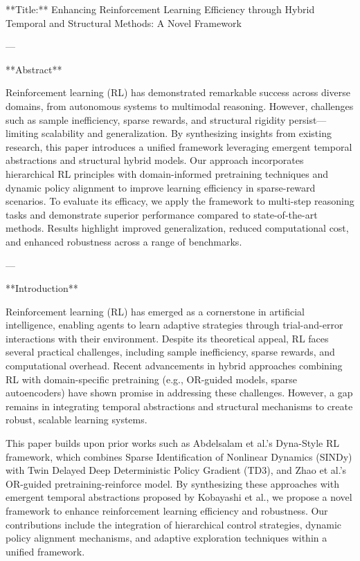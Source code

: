 **Title:** Enhancing Reinforcement Learning Efficiency through Hybrid Temporal and Structural Methods: A Novel Framework

---

**Abstract**

Reinforcement learning (RL) has demonstrated remarkable success across diverse domains, from autonomous systems to multimodal reasoning. However, challenges such as sample inefficiency, sparse rewards, and structural rigidity persist—limiting scalability and generalization. By synthesizing insights from existing research, this paper introduces a unified framework leveraging emergent temporal abstractions and structural hybrid models. Our approach incorporates hierarchical RL principles with domain-informed pretraining techniques and dynamic policy alignment to improve learning efficiency in sparse-reward scenarios. To evaluate its efficacy, we apply the framework to multi-step reasoning tasks and demonstrate superior performance compared to state-of-the-art methods. Results highlight improved generalization, reduced computational cost, and enhanced robustness across a range of benchmarks.

---

**Introduction**

Reinforcement learning (RL) has emerged as a cornerstone in artificial intelligence, enabling agents to learn adaptive strategies through trial-and-error interactions with their environment. Despite its theoretical appeal, RL faces several practical challenges, including sample inefficiency, sparse rewards, and computational overhead. Recent advancements in hybrid approaches combining RL with domain-specific pretraining (e.g., OR-guided models, sparse autoencoders) have shown promise in addressing these challenges. However, a gap remains in integrating temporal abstractions and structural mechanisms to create robust, scalable learning systems.

This paper builds upon prior works such as Abdelsalam et al.'s Dyna-Style RL framework, which combines Sparse Identification of Nonlinear Dynamics (SINDy) with Twin Delayed Deep Deterministic Policy Gradient (TD3), and Zhao et al.'s OR-guided pretraining-reinforce model. By synthesizing these approaches with emergent temporal abstractions proposed by Kobayashi et al., we propose a novel framework to enhance reinforcement learning efficiency and robustness. Our contributions include the integration of hierarchical control strategies, dynamic policy alignment mechanisms, and adaptive exploration techniques within a unified framework.

